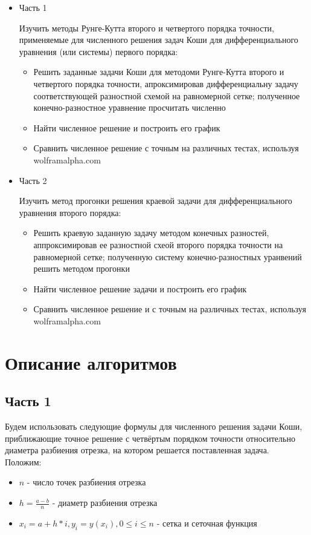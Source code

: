 \documentclass[a4paper,12pt,titlepage,finall]{article}
\begin{document}
\begin{itemize}

\item Часть 1

Изучить методы Рунге-Кутта второго и четвертого порядка точности, применяемые для численного решения задач Коши для дифференциального уравнения (или системы) первого порядка:

\begin{itemize}
\item Решить заданные задачи Коши для методоми Рунге-Кутта второго и четвертого порядка точности, апроксимировав дифференциальну задачу соответствующей разностной схемой на равномерной сетке; полученное конечно-разностное уравнение просчитать численно
\item Найти численное решение и построить его график
\item Сравнить численное решение с точным на различных тестах, используя wolframalpha.com
\end{itemize}

\item Часть 2

Изучить метод прогонки решения краевой задачи для дифференциального уравнения второго порядка:

\begin{itemize}
\item Решить краевую заданную задачу методом конечных разностей, аппроксимировав ее разностной схеой второго порядка точности на равномерной сетке; полученную систему конечно-разностных уранвений решить методом прогонки
\item Найти численное решение задачи и построить его график
\item  Сравнить численное решение и с точным на различных тестах, используя wolframalpha.com
\end{itemize}

\end{itemize}

\newpage


\section{Описание алгоритмов}

\subsection{Часть 1}
Будем использовать следующие формулы для численного решения задачи Коши, приближающие точное решение с четвёртым порядком точности относительно диаметра разбиения отрезка, на котором решается поставленная задача.\\
Положим:\\
\begin{itemize}
\item $n$ - число точек разбиения отрезка\\
\item $ h=\frac{a - b}{n}$ - диаметр разбиения отрезка\\
\item $ x_{i} = a + h * i, y_{i} = y(x_{i}), 0 \leq i \leq n $ - сетка и сеточная функция\\
\end{itemize}
\end{document}
